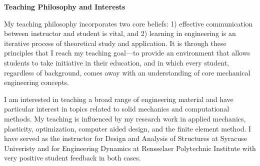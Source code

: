 \documentclass[11pt]{article}
\begin{document}
\thispagestyle{fancy}



%

%

\begin{center}
{\Large \textbf{Teaching Philosophy and Interests}} \\
\end{center}
\vspace{.1in}

My teaching philosophy incorporates two core beliefs:  1)  effective communication between instructor and student is vital, and 2) learning in engineering is an iterative process of theoretical study and application.  It is through these principles that I reach my teaching goal---to provide an environment that allows students to take initiative in their education, and in which every student, regardless of background, comes away with an understanding of core mechanical engineering concepts.

\vspace{0.1in}

I am interested in teaching a broad range of engineering material and have particular interest in topics related to solid mechanics and computational methods.  My teaching is influenced by my research work in applied mechanics, plasticity, optimization, computer aided design, and the finite element method.  I have served as the instructor for Design and Analysis of Structures at Syracuse Univeristy and for Engineering Dynamics at Rensselaer Polytechnic Institute with very positive student feedback in both cases.
\end{document}
